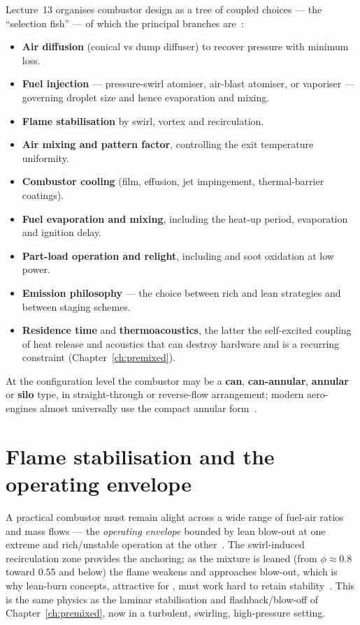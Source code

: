 Lecture~13 organises combustor design as a tree of coupled choices --- the ``selection fish'' --- of which the principal branches are~\cite{lecture13}:
\begin{itemize}[leftmargin=1.5em,itemsep=2pt]
\item \textbf{Air diffusion} (conical vs dump diffuser) to recover pressure with minimum loss.
\item \textbf{Fuel injection} --- pressure-swirl atomiser, air-blast atomiser, or vaporiser --- governing droplet size and hence evaporation and mixing.
\item \textbf{Flame stabilisation} by swirl, vortex and recirculation.
\item \textbf{Air mixing and pattern factor}, controlling the exit temperature uniformity.
\item \textbf{Combustor cooling} (film, effusion, jet impingement, thermal-barrier coatings).
\item \textbf{Fuel evaporation and mixing}, including the heat-up period, evaporation and ignition delay.
\item \textbf{Part-load operation and relight}, including  and soot oxidation at low power.
\item \textbf{Emission philosophy} --- the choice between rich and lean strategies and between staging schemes.
\item \textbf{Residence time} and \textbf{thermoacoustics}, the latter the self-excited coupling of heat release and acoustics that can destroy hardware and is a recurring constraint (Chapter~\ref{ch:premixed}).
\end{itemize}
At the configuration level the combustor may be a \textbf{can}, \textbf{can-annular}, \textbf{annular} or \textbf{silo} type, in straight-through or reverse-flow arrangement; modern aero-engines almost universally use the compact annular form~\cite{lecture13}.

\section{Flame stabilisation and the operating envelope}

A practical combustor must remain alight across a wide range of fuel-air ratios and mass flows --- the \emph{operating envelope} bounded by lean blow-out at one extreme and rich/unstable operation at the other~\cite{lecture13}. The swirl-induced recirculation zone provides the anchoring; as the mixture is leaned (from $\phi\approx0.8$ toward $0.55$ and below) the flame weakens and approaches blow-out, which is why lean-burn concepts, attractive for , must work hard to retain stability~\cite{lecture13}. This is the same physics as the laminar stabilisation and flashback/blow-off of Chapter~\ref{ch:premixed}, now in a turbulent, swirling, high-pressure setting.

